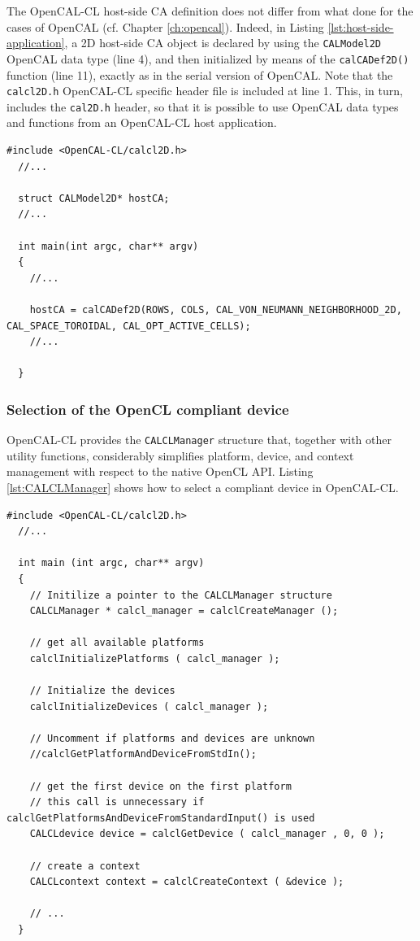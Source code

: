 The OpenCAL-CL host-side CA definition does not differ from what done
for the cases of OpenCAL (cf. Chapter \ref{ch:opencal}). Indeed, in
Listing \ref{lst:host-side-application}, a 2D host-side CA object is
declared by using the \verb'CALModel2D' OpenCAL data type (line 4),
and then initialized by means of the \verb'calCADef2D()' function
(line 11), exactly as in the serial version of OpenCAL. Note that the
\verb'calcl2D.h' OpenCAL-CL specific header file is included at line
1. This, in turn, includes the \verb'cal2D.h' header, so that it is
possible to use OpenCAL data types and functions from an OpenCAL-CL
host application.

\begin{lstlisting}[float,floatplacement=H, label=lst:host-side-application, caption={An example of OpenCAL-CL host-side application.}]
  #include <OpenCAL-CL/calcl2D.h>
  //...

  struct CALModel2D* hostCA;
  //...

  int main(int argc, char** argv)
  {
    //...

    hostCA = calCADef2D(ROWS, COLS, CAL_VON_NEUMANN_NEIGHBORHOOD_2D, CAL_SPACE_TOROIDAL, CAL_OPT_ACTIVE_CELLS);
    //...

  }
\end{lstlisting}


\subsubsection{Selection of the OpenCL compliant device}

OpenCAL-CL provides the \verb'CALCLManager' structure that, together with
other utility functions, considerably simplifies platform, device, and
context management with respect to the native OpenCL API. Listing
\ref{lst:CALCLManager} shows how to select a compliant device in
OpenCAL-CL.

\begin{lstlisting}[float,floatplacement=H, label=lst:CALCLManager, caption=Access to platform and devices.]
  #include <OpenCAL-CL/calcl2D.h>
  //...

  int main (int argc, char** argv)
  {
    // Initilize a pointer to the CALCLManager structure
    CALCLManager * calcl_manager = calclCreateManager ();

    // get all available platforms
    calclInitializePlatforms ( calcl_manager );

    // Initialize the devices
    calclInitializeDevices ( calcl_manager );

    // Uncomment if platforms and devices are unknown
    //calclGetPlatformAndDeviceFromStdIn();

    // get the first device on the first platform
    // this call is unnecessary if calclGetPlatformsAndDeviceFromStandardInput() is used
    CALCLdevice device = calclGetDevice ( calcl_manager , 0, 0 );

    // create a context
    CALCLcontext context = calclCreateContext ( &device );

    // ...
  }
\end{lstlisting}

